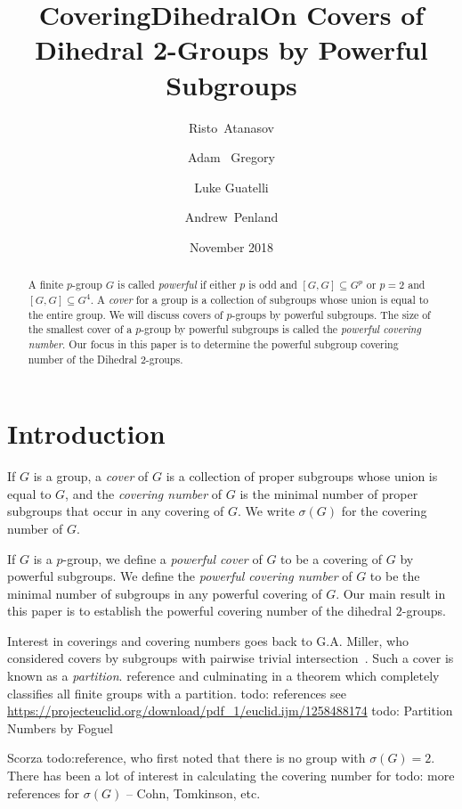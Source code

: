 \documentclass{amsart}
\title{CoveringDihedral}
\author{}
\date{November 2018}
\title[On Covers of Dihedral 2-Groups by Powerful Subgroups]
            {On Covers of Dihedral 2-Groups by Powerful Subgroups}
\author[R.~Atanasov]{Risto~Atanasov}
\author[A.~Gregory]{Adam ~Gregory}
\author[L.~Guatelli]{Luke Guatelli}
\author[A.~Penland]{Andrew~Penland}
\numberwithin{equation} {section}
\theoremstyle{definition}
\begin{document}
\maketitle

\begin{abstract}
A finite $p$-group $G$ is called \textit{powerful} if either $p$ is odd and $[G,G]\subseteq G^p$ or $p=2$ and $[G,G]\subseteq G^4$. A {\em{cover}} for a group is a collection of subgroups whose union is equal to the entire group.   We will discuss covers of $p$-groups by powerful subgroups. The size of the smallest cover of a $p$-group by powerful subgroups is called the \textit{powerful covering number}. Our focus in this paper is to determine the powerful subgroup covering number of the Dihedral 2-groups.
\end{abstract}



\maketitle

\section{Introduction}

If $G$ is a group, a \textit{cover} of $G$ is a collection of proper subgroups whose union is equal to $G$, and the \textit{covering number} of $G$ is the minimal number of proper subgroups that occur in any covering of $G$. We write $\sigma(G)$ for the covering number of $G$. 

If $G$ is a $p$-group, we define a \textit{powerful cover} of $G$ to be a covering of $G$ by powerful subgroups. We define the \textit{powerful covering number} of $G$ to be the minimal number of subgroups in any powerful covering of $G$. Our main result in this paper is to establish the powerful covering number of the dihedral $2$-groups. 

Interest in coverings and covering numbers goes back to G.A. Miller, who considered covers by subgroups with pairwise trivial intersection~\cite{}. Such a cover is known as a \textit{partition}. reference and culminating in a theorem which completely classifies all finite groups with a partition. todo: references  see \url{https://projecteuclid.org/download/pdf_1/euclid.ijm/1258488174}  todo: Partition Numbers by Foguel

Scorza todo:reference, who first noted that there is no group with $\sigma(G) = 2.$ There has been a lot of interest in calculating the covering number for  todo: more references for $\sigma(G)$ -- Cohn, Tomkinson, etc. 
\end{document}
